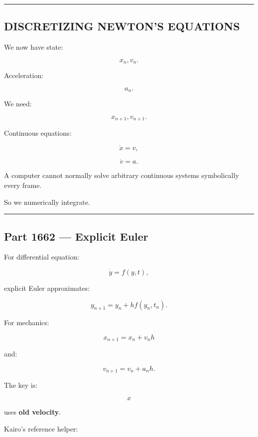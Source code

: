 \begin{center}\rule{0.5\linewidth}{0.5pt}\end{center}

\subsection{DISCRETIZING NEWTON'S EQUATIONS}\label{06-engine-ii-ch037-discretizing-newtons-equations}

\hypertarget{06-engine-ii-ch037-discretizing-newtons-equations}{}

We now have state:

\[
x_n,
v_n.
\]

Acceleration:

\[
a_n.
\]

We need:

\[
x_{n+1},
v_{n+1}.
\]

Continuous equations:

\[
\dot x=v,
\]

\[
\dot v=a.
\]

A computer cannot normally solve arbitrary continuous systems symbolically every frame.

So we numerically integrate.

\begin{center}\rule{0.5\linewidth}{0.5pt}\end{center}

\subsection{Part 1662 --- Explicit Euler}\label{06-engine-ii-ch037-part-1662-explicit-euler}

\hypertarget{06-engine-ii-ch037-part-1662-explicit-euler}{}

For differential equation:

\[
\dot y=f(y,t),
\]

explicit Euler approximates:

\[
\boxed{
y_{n+1}
=
y_n+
h f(y_n,t_n).
}
\]

For mechanics:

\[
x_{n+1}
=
x_n+
v_nh
\]

and:

\[
v_{n+1}
=
v_n+
a_nh.
\]

The key is:

\[
x
\]

uses \textbf{old velocity}.

Kairo's reference helper:

